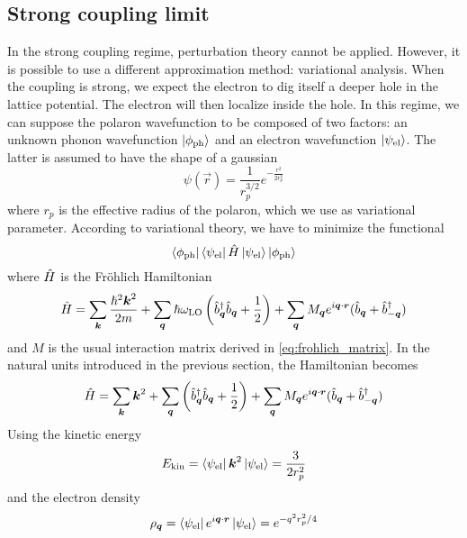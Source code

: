 \subsection{Strong coupling limit}
In the strong coupling regime, perturbation theory cannot be applied. However, it is possible to use a different approximation method: variational analysis. When the coupling is strong, we expect the electron to dig itself a deeper hole in the lattice potential. The electron will then localize inside the hole. In this regime, we can suppose the polaron wavefunction to be composed of two factors: an unknown phonon wavefunction $\ket{\phi_\text{ph}}$ and an electron wavefunction $\ket{\psi_\text{el}}$. The latter is assumed to have the shape of a gaussian
\begin{equation}
    \psi(\vec{r}) = \frac{1}{r_p^{3/2}}e^{-\frac{r^2}{2r_p^2}}
\end{equation}
where $r_p$ is the effective radius of the polaron, which we use as variational parameter. According to variational theory, we have to minimize the functional
\begin{equation}
    \bra{\phi_\text{ph}} \bra{\psi_\text{el}} \hat{H} \ket{\psi_\text{el}} \ket{\phi_\text{ph}}
\end{equation}
where $\hat{H}$ is the Fr\"{o}hlich Hamiltonian
\begin{equation}
    \hat{H} = \sum_{\mathbf{\boldsymbol{k}}} \frac{\hslash^2\mathbf{\boldsymbol{k}}^2}{2m}
    + \sum_{\mathbf{\boldsymbol{q}}} \hslash \omega_\text{LO} \left( \hat{b}^\dagger_{ \mathbf{\boldsymbol{q}}} \hat{b}_{ \mathbf{\boldsymbol{q}}} + \frac{1}{2} \right)
    + \sum_{\mathbf{\boldsymbol{q}}} M_{\mathbf{\boldsymbol{q}}} e^{i\mathbf{\boldsymbol{q}}\cdot\mathbf{\boldsymbol{r}}} (\hat{b}_{\mathbf{\boldsymbol{q}}} + \hat{b}^\dagger_{-\mathbf{\boldsymbol{q}}})
\end{equation}
and $M$ is the usual interaction matrix derived in \cref{eq:frohlich_matrix}. In the natural units introduced in the previous section, the Hamiltonian becomes
\begin{equation}
    \hat{H} = \sum_{\mathbf{\boldsymbol{k}}} \mathbf{\boldsymbol{k}}^2
    + \sum_{\mathbf{\boldsymbol{q}}} \left( \hat{b}^\dagger_{ \mathbf{\boldsymbol{q}}} \hat{b}_{ \mathbf{\boldsymbol{q}}} + \frac{1}{2} \right)
    + \sum_{\mathbf{\boldsymbol{q}}} M_{\mathbf{\boldsymbol{q}}} e^{i\mathbf{\boldsymbol{q}}\cdot\mathbf{\boldsymbol{r}}} (\hat{b}_{\mathbf{\boldsymbol{q}}} + \hat{b}^\dagger_{-\mathbf{\boldsymbol{q}}})
\end{equation}
Using the kinetic energy
\begin{equation}
    E_\text{kin} = \bra{\psi_\text{el}} \mathbf{\boldsymbol{k}}^2 \ket{\psi_\text{el}}  = \frac{3}{2r_p^2}
\end{equation}
and the electron density
\begin{equation} \label{eq:electron_density}
    \rho_{\mathbf{\boldsymbol{q}}} = \bra{\psi_\text{el}} e^{i\mathbf{\boldsymbol{q}}\cdot\mathbf{\boldsymbol{r}}} \ket{\psi_\text{el}} = e^{-q^2r_p^2/4}
\end{equation}
